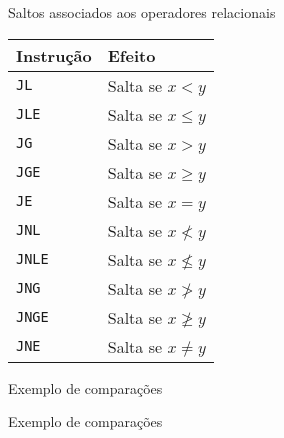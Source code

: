 \begin{frame}[fragile]{Saltos associados aos operadores relacionais}

    \begin{table}[ht]
        \centering
        \begin{tabular}{ll}
            \toprule
            \textbf{Instrução} & \textbf{Efeito} \\
            \midrule
                \texttt{JL} & Salta se $x < y$ \\
                \texttt{JLE} & Salta se $x \leq y$ \\
                \texttt{JG} & Salta se $x > y$ \\
                \texttt{JGE} & Salta se $x \geq y$ \\
                \texttt{JE} & Salta se $x = y$ \\
            \midrule
                \texttt{JNL} & Salta se $x \nless y$ \\
                \texttt{JNLE} & Salta se $x \nleq y$ \\
                \texttt{JNG} & Salta se $x \ngtr y$ \\
                \texttt{JNGE} & Salta se $x \ngeq y$ \\
                \texttt{JNE} & Salta se $x \neq y$ \\
            \bottomrule
        \end{tabular}
        
    \end{table}

\end{frame}

\begin{frame}[fragile]{Exemplo de comparações}
\end{frame}

\begin{frame}[fragile]{Exemplo de comparações}
\end{frame}

